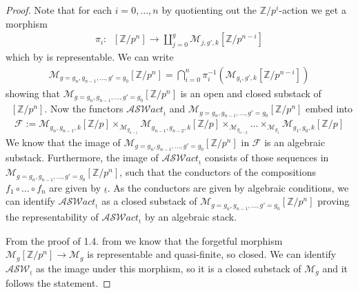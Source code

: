 \documentclass{compositio}
\newcommand{\huy}[1]{\todo[color=yellow]{HD: #1}}
\newcommand{\mat}[1]{\todo[color=green]{MH: #1}}
\theoremstyle{remark}
\theoremstyle{remark}
\DeclareMathOperator{\Mgg}{\mathcal{M}_{g,g',k}}
\begin{document}
\begin{proof}
Note that for each $i=0, \dots, n$ by 
quotienting out the $\mathbb{Z}/p^i$-action we get a morphism 
\begin{align*}
    \pi_i: \Mgg[\mathbb{Z}/p^n] \to \coprod_{j=0}^g \mathcal{M}_{j,g',k}[\mathbb{Z}/p^{n-i}]
\end{align*}
which by \cite[Proposition 2.4]{MR2223481} is representable. We can write
\begin{align*}
    \mathcal{M}_{g=g_n, g_{n-1}, \dots, g'=g_0}[\mathbb{Z}/p^n] = \bigcap_{i=0}^n \pi_i^{-1} (\mathcal{M}_{g_i,g',k}[\mathbb{Z}/p^{n-i}])
\end{align*}
showing that $\mathcal{M}_{g=g_n, g_{n-1}, \dots, g'=g_0}[\mathbb{Z}/p^n]$ is an open and closed substack of $\Mgg[\mathbb{Z}/p^n]$. Now the functors $\mathcal{ASW}act_{\underline{\iota}}$ and $\mathcal{M}_{g=g_n, g_{n-1}, \dots, g'=g_0}[\mathbb{Z}/p^n]$ embed into
 \begin{align*}
     \mathcal{F}:={\mathcal{M}}_{g_n,g_{n-1},k}[\mathbb{Z}/p] \times_{\mathcal{M}_{g_{n-1}}} {\mathcal{M}}_{g_{n-1},g_{n-2},k}[\mathbb{Z}/p] \times_{\mathcal{M}_{g_{n-2}}} \dots \times_{\mathcal{M}_{g_{1}}} {\mathcal{M}}_{g_{1},g_{0},k}[\mathbb{Z}/p]
 \end{align*}
We know that the image of $\mathcal{M}_{g=g_n, g_{n-1}, \dots, g'=g_0}[\mathbb{Z}/p^n]$ in $\mathcal{F}$ is an algebraic substack. Furthermore, the image of $\mathcal{ASW}act_{\underline{\iota}}$ consists of those sequences in $\mathcal{M}_{g=g_n, g_{n-1}, \dots, g'=g_0}[\mathbb{Z}/p^n]$, such that the conductors of the compositions $f_1 \circ \dots \circ f_n$
are given by $\underline{\iota}$. As the conductors are given by algebraic conditions, we can identify $\mathcal{ASW}act_{\underline{\iota}}$ as a closed substack of $\mathcal{M}_{g=g_n, g_{n-1}, \dots, g'=g_0}[\mathbb{Z}/p^n]$ 
proving the representability of $\mathcal{ASW}act_{\underline{\iota}}$ by an algebraic stack.

From the proof of 1.4. from \cite{MR1216034} we know that the forgetful morphism $\mathcal{M}_g[\mathbb{Z}/p^n] \to \mathcal{M}_g$ is representable and quasi-finite, so closed. We can identify $\mathcal{ASW}_{\underline{\iota}}$ as the image under this morphism, so it is a closed substack of $\mathcal{M}_g$ and it follows the statement.
\end{proof}
\end{document}
